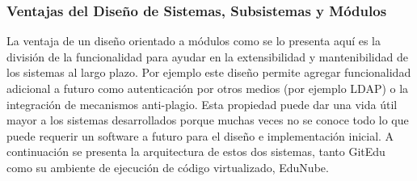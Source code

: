 \subsubsection{Ventajas del Diseño de Sistemas, Subsistemas y Módulos}
La ventaja de un diseño orientado a módulos como se lo presenta aquí es la división de la funcionalidad para ayudar en la extensibilidad y mantenibilidad de los sistemas al largo plazo. Por ejemplo este diseño permite agregar funcionalidad adicional a futuro como autenticación por otros medios (por ejemplo LDAP) o la integración de mecanismos anti-plagio. Esta propiedad puede dar una vida útil mayor a los sistemas desarrollados porque muchas veces no se conoce todo lo que puede requerir un software a futuro para el diseño e implementación inicial. A continuación se presenta la arquitectura de estos dos sistemas, tanto GitEdu como su ambiente de ejecución de código virtualizado, EduNube.


